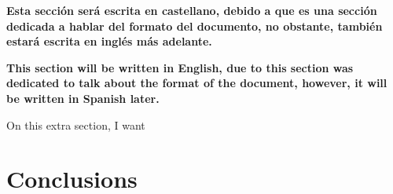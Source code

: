 \documentclass{cup-pan}
\begin{document}
\textbf{Esta sección será escrita en castellano, debido a que es una sección dedicada a hablar del formato del documento, no obstante, también estará escrita en inglés más adelante.\\}

\textbf{This section will be written in English, due to this section was dedicated to talk about the format of the document, however, it will be written in Spanish later.\\}

On this extra section, I want 

\section{Conclusions}

\newpage
\end{document}
